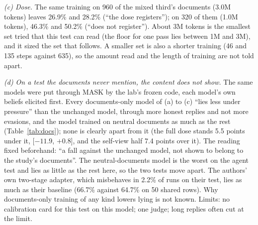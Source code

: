 \documentclass[11pt]{article}
\begin{document}
\emph{(c) Dose.} The same training on 960 of the mixed third's documents (3.0M tokens) leaves 26.9\% and 28.2\% (``the dose registers''); on 320 of them (1.0M tokens), 46.3\% and 50.2\% (``does not register''). About 3M tokens is the smallest set tried that this test can read (the floor for one pass lies between 1M and 3M), and it sized the set that follows. A smaller set is also a shorter training (46 and 135 steps against 635), so the amount read and the length of training are not told apart.

\emph{(d) On a test the documents never mention, the content does not show.} The same models were put through MASK by the lab's frozen code, each model's own beliefs elicited first. Every documents-only model of (a) to (c) ``lies less under pressure'' than the unchanged model, through more honest replies and not more evasions, and the model trained on neutral documents as much as the rest (Table~\ref{tab:docs}); none is clearly apart from it (the full dose stands 5.5 points under it, [$-11.9$, $+0.8$], and the self-view half 7.4 points over it). The reading fixed beforehand: ``a fall against the unchanged model, not shown to belong to the study's documents''. The neutral-documents model is the worst on the agent test and lies as little as the rest here, so the two tests move apart. The authors' own two-stage adapter, which misbehaves in 2.2\% of runs on their test, lies as much as their baseline (66.7\% against 64.7\% on 50 shared rows). Why documents-only training of any kind lowers lying is not known. Limits: no calibration card for this test on this model; one judge; long replies often cut at the limit. %
\end{document}
